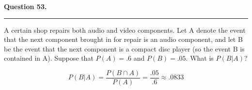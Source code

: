 \textbf{Question 53.} \\
\hrule 

A certain shop repairs both audio and video components. Let A denote the event that the next component brought in for repair is an audio component, and let B be the event that the next component is a compact disc player (so the event B is contained in A). Suppose that $P(A) = .6$ and $P(B) = .05$. What is $P(B | A)$?

\[P(B | A) = \frac{P(B \cap A)}{P(A)} = \frac{.05}{.6} \approx \boxed{.0833}\]